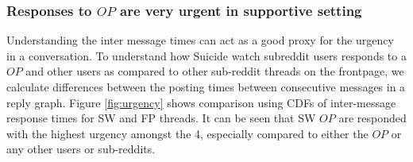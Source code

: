 \subsubsection{Responses to $OP$ are very urgent in supportive setting}
Understanding the inter message times can act as a good proxy for the urgency in a conversation. To understand how Suicide watch subreddit users responds to a $OP$ and other users as compared to other sub-reddit threads on the frontpage, we calculate differences between the posting times between consecutive messages in a reply graph. Figure \ref{fig:urgency} shows comparison using CDFs of inter-message response times for SW and FP threads. It can be seen that SW $OP$ are responded with the highest urgency amongst the 4, especially compared to either the $OP$ or any other users or sub-reddits. 


